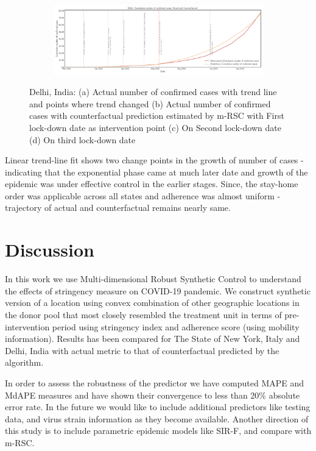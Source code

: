 \documentclass[fleqn,10pt]{wlscirep}
\begin{document}
\begin{figure}
	\begin{subfigure}[b]{\textwidth}
		\centering
		\includegraphics[width=0.8\linewidth,height=0.18\textheight]{FIG20}
	\end{subfigure}
	
	\caption[Delhi]{Delhi, India: (a) Actual number of confirmed cases with  trend line and points where trend changed (b) Actual number of confirmed cases with counterfactual prediction estimated by m-RSC with First lock-down date as intervention point (c) On Second lock-down date (d) On third  lock-down date}
	\label{fig7} 
\end{figure}

Linear trend-line fit shows two change points in the growth of number of cases - indicating that the exponential phase came at much later date and growth of the epidemic was under effective control in the earlier stages. Since, the stay-home order was applicable across all states and adherence was almost uniform -  trajectory of actual and counterfactual remains nearly same.

\section*{Discussion}
\label{SEC5}
In this work we use Multi-dimensional Robust Synthetic Control to understand the effects of stringency measure on COVID-19 pandemic. We construct synthetic version of a location using convex combination of other geographic locations in the donor pool that most closely resembled the treatment unit in terms of pre-intervention period using stringency index and adherence score (using mobility information). Results has been compared for The State of New York, Italy and Delhi, India with actual metric to that of counterfactual predicted by the algorithm.

In order to assess the robustness of the predictor we have computed MAPE and MdAPE measures and have shown their convergence to less than 20\% absolute error rate. In the future we would like to include  additional predictors like testing data, and virus strain information as they become available. Another direction of this study is to include parametric epidemic models like SIR-F\cite{Siettos2013}, and compare with m-RSC.
\end{document}
